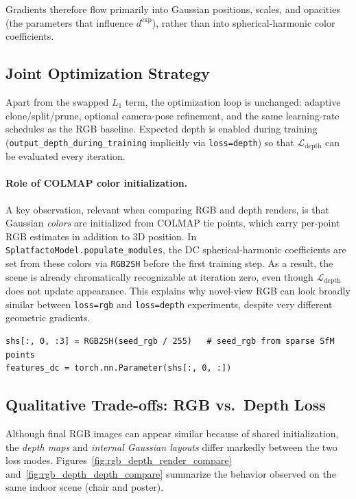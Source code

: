 Gradients therefore flow primarily into Gaussian positions, scales, and opacities (the parameters that influence $d^{\mathrm{exp}}$), rather than into spherical-harmonic color coefficients.

\subsection{Joint Optimization Strategy}
\label{subsec:depth_joint_opt}

Apart from the swapped $L_1$ term, the optimization loop is unchanged: adaptive clone/split/prune, optional camera-pose refinement, and the same learning-rate schedules as the RGB baseline. Expected depth is enabled during training (\texttt{output\_depth\_during\_training} implicitly via \texttt{loss=depth}) so that $\mathcal{L}_{\mathrm{depth}}$ can be evaluated every iteration.

\paragraph{Role of COLMAP color initialization.}
A key observation, relevant when comparing RGB and depth renders, is that Gaussian \emph{colors} are initialized from COLMAP tie points, which carry per-point RGB estimates in addition to 3D position. In \texttt{SplatfactoModel.populate\_modules}, the DC spherical-harmonic coefficients are set from these colors via \texttt{RGB2SH} before the first training step. As a result, the scene is already chromatically recognizable at iteration zero, even though $\mathcal{L}_{\mathrm{depth}}$ does not update appearance. This explains why novel-view RGB can look broadly similar between \texttt{loss=rgb} and \texttt{loss=depth} experiments, despite very different geometric gradients.

\begin{lstlisting}[caption={Color initialization from COLMAP seed points (\filepath{splatfacto.py}).},label={lst:colmap_color_init}]
shs[:, 0, :3] = RGB2SH(seed_rgb / 255)   # seed_rgb from sparse SfM points
features_dc = torch.nn.Parameter(shs[:, 0, :])
\end{lstlisting}

\subsection{Qualitative Trade-offs: RGB vs.\ Depth Loss}
\label{subsec:depth_rgb_tradeoff}

Although final RGB images can appear similar because of shared initialization, the \emph{depth maps} and \emph{internal Gaussian layouts} differ markedly between the two loss modes. Figures~\ref{fig:rgb_depth_render_compare} and~\ref{fig:rgb_depth_depth_compare} summarize the behavior observed on the same indoor scene (chair and poster).

